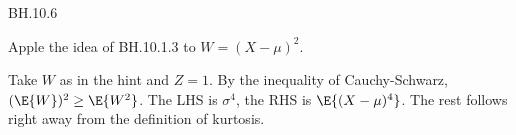 
\setcounter{theorem}{5}
\begin{exercise}BH.10.6
\begin{hint}
Apple the idea of BH.10.1.3 to $W=(X-\mu)^2$.
\end{hint}
\begin{solution}
Take $W$ as in the hint and $Z=1$. By the inequality of Cauchy-Schwarz, $(\E{W})^2 \geq \E{W^2}$. The LHS is $\sigma^{4}$, the RHS is $\E{(X-\mu)^4}$. The rest  follows right away from the definition of kurtosis.
\end{solution}
\end{exercise}

